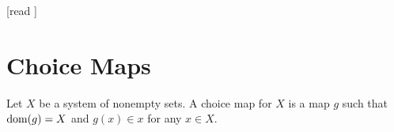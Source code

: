 \documentclass[10pt]{article}
\begin{document}
  \begin{imports}
    \begin{forthel}
      [read ]
    \end{forthel}
  \end{imports}


  \section*{Choice Maps}

  \begin{forthel}
    \begin{definition}[id=FOUNDATIONS_10_1352015487625913,printid]
      Let $X$ be a system of nonempty sets.
      A choice map for $X$ is a map $g$ such that $\operatorname{dom}(g) = X$ and $g(x) \in x$ for any $x \in X$.
    \end{definition}
  \end{forthel}
\end{document}
